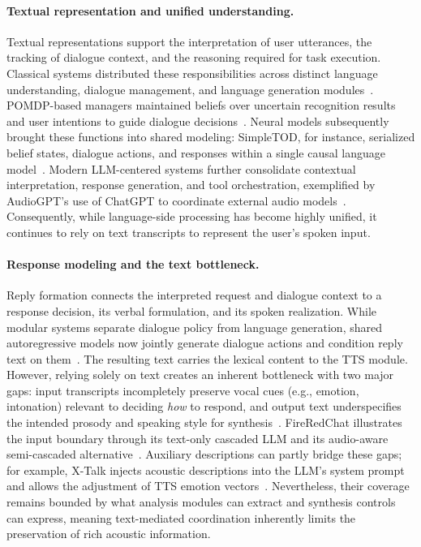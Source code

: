 % 

\paragraph{Textual representation and unified understanding.}
Textual representations support the interpretation of user utterances, the tracking of dialogue context, and the reasoning required for task execution. Classical systems distributed these responsibilities across distinct language understanding, dialogue management, and language generation modules~\citep{DBLP:journals/csur/McTear02}. POMDP-based managers maintained beliefs over uncertain recognition results and user intentions to guide dialogue decisions~\citep{DBLP:journals/pieee/YoungGTW13}. Neural models subsequently brought these functions into shared modeling: SimpleTOD, for instance, serialized belief states, dialogue actions, and responses within a single causal language model~\citep{DBLP:conf/nips/Hosseini-AslMWY20}. Modern LLM-centered systems further consolidate contextual interpretation, response generation, and tool orchestration, exemplified by AudioGPT's use of ChatGPT to coordinate external audio models~\citep{DBLP:conf/aaai/HuangLYSCYWHHLR24}. Consequently, while language-side processing has become highly unified, it continues to rely on text transcripts to represent the user's spoken input.

\paragraph{Response modeling and the text bottleneck.}
Reply formation connects the interpreted request and dialogue context to a response decision, its verbal formulation, and its spoken realization. While modular systems separate dialogue policy from language generation, shared autoregressive models now jointly generate dialogue actions and condition reply text on them~\citep{DBLP:journals/csur/McTear02,DBLP:conf/nips/Hosseini-AslMWY20}. The resulting text carries the lexical content to the TTS module. However, relying solely on text creates an inherent bottleneck with two major gaps: input transcripts incompletely preserve vocal cues (e.g., emotion, intonation) relevant to deciding \textit{how} to respond, and output text underspecifies the intended prosody and speaking style for synthesis~\citep{DBLP:conf/acl/CuiYJMZWGK25}. FireRedChat illustrates the input boundary through its text-only cascaded LLM and its audio-aware semi-cascaded alternative~\citep{chen2025fireredchat}. Auxiliary descriptions can partly bridge these gaps; for example, X-Talk injects acoustic descriptions into the LLM's system prompt and allows the adjustment of TTS emotion vectors~\citep{DBLP:journals/corr/abs-2512-18706}. Nevertheless, their coverage remains bounded by what analysis modules can extract and synthesis controls can express, meaning text-mediated coordination inherently limits the preservation of rich acoustic information.

